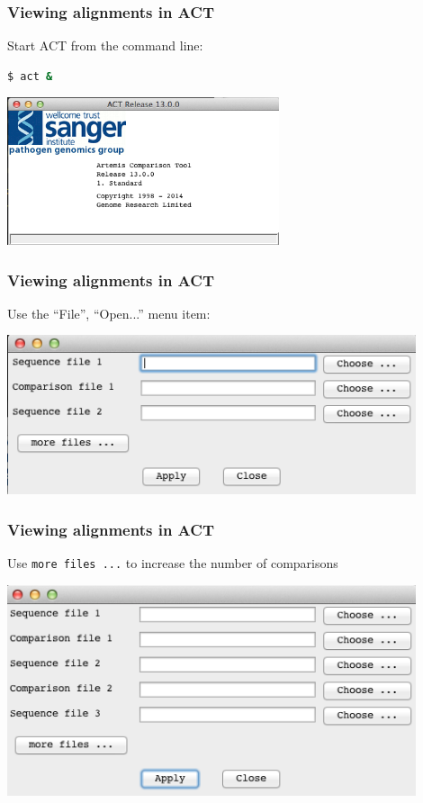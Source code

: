 \documentclass[table]{beamer}
\begin{document}
\begin{frame}[fragile]
\frametitle{Viewing alignments in ACT}
Start ACT from the command line:
\begin{lstlisting}[language=bash]
$ act &
\end{lstlisting}
      \begin{center}
        \includegraphics[width=0.6\textwidth]{images/act_wgs1}
      \end{center}
\end{frame}

    \begin{frame}
      \frametitle{Viewing alignments in ACT}
       Use the ``File'', ``Open...'' menu item:
      \begin{center}
        \includegraphics[width=0.9\textwidth]{images/act_wgs2}
      \end{center}
    \end{frame}

    \begin{frame}
      \frametitle{Viewing alignments in ACT}
      Use \texttt{more files ...} to increase the number of comparisons
      \begin{center}
        \includegraphics[width=0.9\textwidth]{images/act_wgs3}
      \end{center}
    \end{frame}
\end{document}
